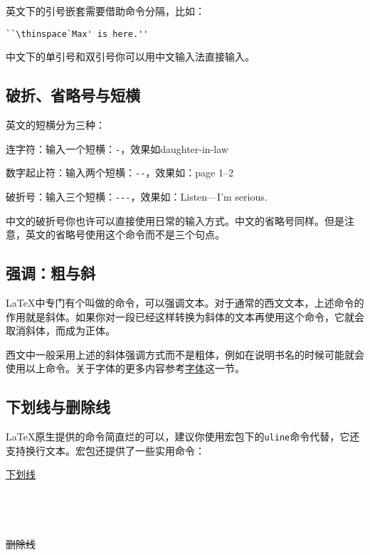 英文下的引号嵌套需要借助命令分隔，比如：
\begin{verbatim}
``\thinspace`Max' is here.''
\end{verbatim}

中文下的单引号和双引号你可以用中文输入法直接输入。

\subsection{破折、省略号与短横}
英文的短横分为三种：
\begin{feai}
\item 连字符：输入一个短横：\verb|-|，效果如daughter-in-law
\item 数字起止符：输入两个短横：\verb|--|，效果如：page 1--2
\item 破折号：输入三个短横：\verb|---|，效果如：Listen---I'm serious.
\end{feai}

中文的破折号你也许可以直接使用日常的输入方式。中文的省略号同样。但是注意，英文的省略号使用这个命令而不是三个句点。

\subsection{强调：粗与斜}
\LaTeX 中专门有个叫做的命令，可以强调文本。对于通常的西文文本，上述命令的作用就是斜体。如果你对一段已经这样转换为斜体的文本再使用这个命令，它就会取消斜体，而成为正体。

西文中一般采用上述的斜体强调方式而不是粗体，例如在说明书名的时候可能就会使用以上命令。关于字体的更多内容参考\hyperref[sec:font]{字体}这一节。

\subsection{下划线与删除线}
\LaTeX 原生提供的命令简直烂的可以，建议你使用宏包下的\texttt{uline}命令代替，它还支持换行文本。宏包还提供了一些实用命令：

\begin{codeshow}
\uline{下划线} \\
 \\
 \\
 \\
 \\
\sout{删除线} \\
\end{codeshow}


